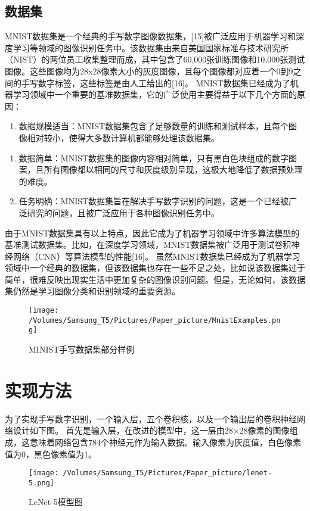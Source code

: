 \documentclass[11pt]{article}
\begin{document}
\subsection{数据集}
\label{sec:orgb7c0ade}
MNIST数据集是一个经典的手写数字图像数据集，[15]被广泛应用于机器学习和深度学习等领域的图像识别任务中。该数据集由来自美国国家标准与技术研究所（NIST）的两位员工收集整理而成，其中包含了60,000张训练图像和10,000张测试图像。这些图像均为28x28像素大小的灰度图像，且每个图像都对应着一个0到9之间的手写数字标签，这些标签是由人工给出的[16]。
MNIST数据集已经成为了机器学习领域中一个重要的基准数据集，它的广泛使用主要得益于以下几个方面的原因：
\begin{enumerate}
\item 数据规模适当：MNIST数据集包含了足够数量的训练和测试样本，且每个图像相对较小，使得大多数计算机都能够处理该数据集。
\end{enumerate}
\begin{enumerate}
\item 数据简单：MNIST数据集的图像内容相对简单，只有黑白色块组成的数字图案，且所有图像都以相同的尺寸和灰度级别呈现，这极大地降低了数据预处理的难度。
\item 任务明确：MNIST数据集旨在解决手写数字识别的问题，这是一个已经被广泛研究的问题，且被广泛应用于各种图像识别任务中。
\end{enumerate}
由于MNIST数据集具有以上特点，因此它成为了机器学习领域中许多算法模型的基准测试数据集。比如，在深度学习领域，MNIST数据集被广泛用于测试卷积神经网络（CNN）等算法模型的性能[16]。
虽然MNIST数据集已经成为了机器学习领域中一个经典的数据集，但该数据集也存在一些不足之处，比如说该数据集过于简单，很难反映出现实生活中更加复杂的图像识别问题。但是，无论如何，该数据集仍然是学习图像分类和识别领域的重要资源。

\begin{figure}[htbp]
\centering
\texttt{[image: /Volumes/Samsung\_T5/Pictures/Paper\_picture/MnistExamples.png]}
\caption{MINIST手写数据集部分样例}
\end{figure}
\section{实现方法}
\label{sec:org2d0c826}
为了实现手写数字识别，一个输入层，五个卷积核，以及一个输出层的卷积神经网络设计如下图。
首先是输入层，在改进的模型中，这一层由28×28像素的图像组成，这意味着网络包含784个神经元作为输入数据。输入像素为灰度值，白色像素值为0，黑色像素值为1。

\begin{figure}[htbp]
\centering
\texttt{[image: /Volumes/Samsung\_T5/Pictures/Paper\_picture/lenet-5.png]}
\caption{LeNet-5模型图}
\end{figure}
\end{document}
